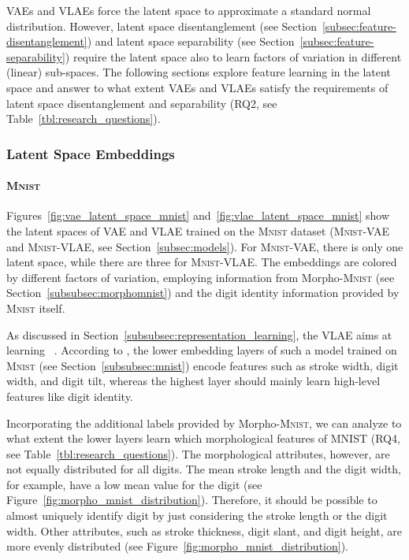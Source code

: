 \acp{VAE} and \acp{VLAE} force the latent space to approximate a standard normal distribution.
However, latent space disentanglement (see Section~\ref{subsec:feature-disentanglement}) and latent space separability (see Section~\ref{subsec:feature-separability}) require the latent space also to learn factors of variation in different (linear) sub-spaces.
The following sections explore feature learning in the latent space and answer to what extent \acp{VAE} and \acp{VLAE} satisfy the requirements of latent space disentanglement and separability (RQ2, see Table~\ref{tbl:research_questions}).

\subsubsection{Latent Space Embeddings}\label{subsubsec:latent_space_embeddings}

\paragraph{\textsc{Mnist}}

Figures~\ref{fig:vae_latent_space_mnist} and~\ref{fig:vlae_latent_space_mnist} show the latent spaces of \ac{VAE} and \ac{VLAE} trained on the \textsc{Mnist} dataset (\textsc{Mnist}-\ac{VAE} and \textsc{Mnist}-\ac{VLAE}, see Section~\ref{subsec:models}).
For \textsc{Mnist}-\ac{VAE}, there is only one latent space, while there are three for \textsc{Mnist}-\ac{VLAE}.
The embeddings are colored by different factors of variation, employing information from Morpho-\textsc{Mnist} (see Section~\ref{subsubsec:morphomnist}) and the digit identity information provided by \textsc{Mnist} itself.

As discussed in Section~\ref{subsubsec:representation_learning}, the \ac{VLAE} aims at learning ~\citep{zhao2017learning}.
According to \citet{zhao2017learning}, the lower embedding layers of such a model trained on \textsc{Mnist} (see Section~\ref{subsubsec:mnist}) encode features such as stroke width, digit width, and digit tilt, whereas the highest layer should mainly learn high-level features like digit identity.

Incorporating the additional labels provided by Morpho-\textsc{Mnist}, we can analyze to what extent the lower layers learn which morphological features of \textsc{MNIST} (RQ4, see Table~\ref{tbl:research_questions}).
The morphological attributes, however, are not equally distributed for all digits.
The mean stroke length and the digit width, for example, have a low mean value for the digit  (see Figure~\ref{fig:morpho_mnist_distribution}).
Therefore, it should be possible to almost uniquely identify digit  by just considering the stroke length or the digit width.
Other attributes, such as stroke thickness, digit slant, and digit height, are more evenly distributed (see Figure~\ref{fig:morpho_mnist_distribution}).

